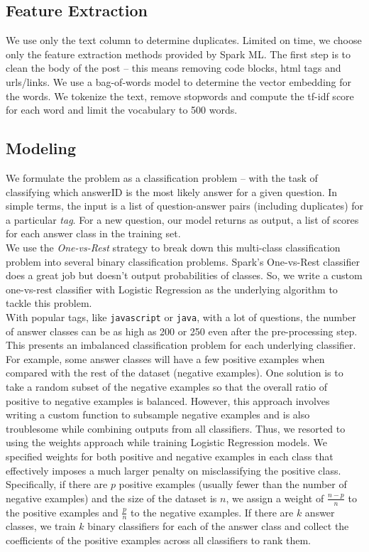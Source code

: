 \documentclass{article}
\begin{document}
\subsection{Feature Extraction}
We use only the text column to determine duplicates. Limited on time, we choose only the feature extraction methods provided by Spark ML. The first step is to clean the body of the post -- this means removing code blocks, html tags and urls/links. We use a bag-of-words model to determine the vector embedding for the words. We tokenize the text, remove stopwords and compute the tf-idf score for each word and limit the vocabulary to 500 words.

\subsection{Modeling}
We formulate the problem as a classification problem -- with the task of classifying which answerID is the most likely answer for a given question. In simple terms, the input is a list of question-answer pairs (including duplicates) for a particular \textit{tag}. For a new question, our model returns as output, a list of scores for each answer class in the training set.\\

We use the \textit{One-vs-Rest} strategy to break down this multi-class classification problem into several binary classification problems. Spark's One-vs-Rest classifier does a great job but doesn't output probabilities of classes. So, we write a custom one-vs-rest classifier with Logistic Regression as the underlying algorithm to tackle this problem.\\

With popular tags, like \texttt{javascript} or \texttt{java}, with a lot of questions, the number of answer classes can be as high as 200 or 250 even after the pre-processing step. This presents an imbalanced classification problem for each underlying classifier. For example, some answer classes will have a few positive examples when compared with the rest of the dataset (negative examples). One solution is to take a random subset of the negative examples so that the overall ratio of positive to negative examples is balanced. However, this approach involves writing a custom function to subsample negative examples and is also troublesome while combining outputs from all classifiers. Thus, we resorted to using the weights approach while training Logistic Regression models. We specified weights for both positive and negative examples in each class that effectively imposes a much larger penalty on misclassifying the positive class. Specifically, if there are $p$ positive examples (usually fewer than the number of negative examples) and the size of the dataset is $n$, we assign a weight of $\frac{n-p}{n}$ to the positive examples and $\frac{p}{n}$ to the negative examples. If there are $k$ answer classes, we train $k$ binary classifiers for each of the answer class and collect the coefficients of the positive examples across all classifiers to rank them.
\end{document}
